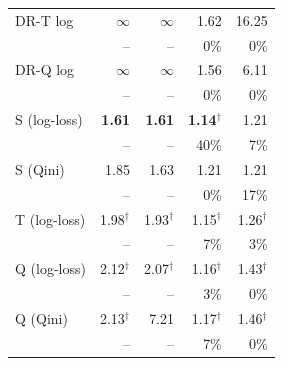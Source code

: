 \documentclass{article}
\begin{document}
\begin{table}[H]
\begin{tabular}{l|rrrr}
DR-T log & $\infty$ & $\infty$ & 1.62 & 16.25 \\
 & \scriptsize -- & \scriptsize -- & \scriptsize 0\% & \scriptsize 0\% \\[2pt]
DR-Q log & $\infty$ & $\infty$ & 1.56 & 6.11 \\
 & \scriptsize -- & \scriptsize -- & \scriptsize 0\% & \scriptsize 0\% \\[2pt]
\hline
S (log-loss) & \textbf{1.61} & \textbf{1.61} & \textbf{1.14}$^\dagger$ & 1.21 \\
 & \scriptsize -- & \scriptsize -- & \scriptsize 40\% & \scriptsize 7\% \\[2pt]
S (Qini) & 1.85 & 1.63 & 1.21 & 1.21 \\
 & \scriptsize -- & \scriptsize -- & \scriptsize 0\% & \scriptsize 17\% \\[2pt]
T (log-loss) & 1.98$^\dagger$ & 1.93$^\dagger$ & 1.15$^\dagger$ & 1.26$^\dagger$ \\
 & \scriptsize -- & \scriptsize -- & \scriptsize 7\% & \scriptsize 3\% \\[2pt]
Q (log-loss) & 2.12$^\dagger$ & 2.07$^\dagger$ & 1.16$^\dagger$ & 1.43$^\dagger$ \\
 & \scriptsize -- & \scriptsize -- & \scriptsize 3\% & \scriptsize 0\% \\[2pt]
Q (Qini) & 2.13$^\dagger$ & 7.21 & 1.17$^\dagger$ & 1.46$^\dagger$ \\
 & \scriptsize -- & \scriptsize -- & \scriptsize 7\% & \scriptsize 0\% \\[2pt]
\hline
\end{tabular}
\end{table}
\end{document}
